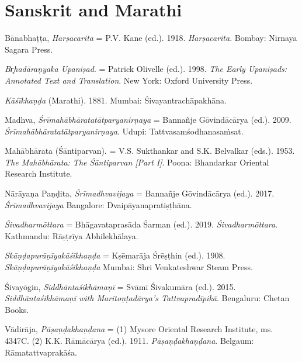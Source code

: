 \section*{Sanskrit and Marathi}
\begin{hangparas}{0.125in}{1}

          
          \label{Kane1918}Bānabhaṭṭa, \emph{{Harṣacarita}} = P.V. Kane (ed.). 1918. \emph{{Harṣacarita}}. Bombay: Nirnaya Sagara Press.\medskip


	  \label{Olivelle1998}\emph{{Br̥hadāraṇyaka Upaniṣad}}. = Patrick Olivelle (ed.). 1998. \emph{The Early Upaniṣads: Annotated Text and Translation}. New York: Oxford University Press.\medskip


          \emph{{Kāśīkhaṇḍa}} (Marathi). 1881. Mumbai: Śivayantrachāpakhāna.\medskip


          \label{Madhva2009}Madhva, \emph{{Śrīmahābhāratatātparyanirṇaya}} = Bannañje Gōvindācārya (ed.). 2009. \emph{{Śrīmahābhāratatātparyanirṇaya}}. Udupi: Tattvasamśodhanasaṁsat.\medskip


	  \label{MBh}Mahābhārata (Śāntiparvan). = V.\thinskip{}S. Sukthankar and S.\thinskip{}K. Belvalkar (eds.). 1953. \emph{The Mahābhārata: The Śāntiparvan [Part I]}. Poona: Bhandarkar Oriental Research Institute.\medskip


          \label{NarayanaPandita2017}Nārāyaṇa Paṇḍita, \emph{{Śrīmadhvavijaya}} = Bannañje Gōvindācārya (ed.). 2017. \emph{{Śrīmadhvavijaya}} Bangalore: Dvaipāyanapratiṣṭhāna.\medskip


          \label{Sivadharmottara}\emph{{Śivadharmōttara}} =  Bhāgavataprasāda Śarman (ed.). 2019. \emph{{Śivadharmōttara}}. Kathmandu:  Rāṣṭrīya Abhilekhālaya. \medskip


          \label{Kasikhanda1908}\emph{{Skāṇḍapurāṇīyakāśīkhaṇḍa}} = Kṣēmarāja Śrēṣṭhin (ed.). 1908. \emph{{Skāṇḍapurāṇīyakāśīkhaṇḍa}} Mumbai: Shri Venkateshwar Steam Press.\medskip


          \label{Sivayogin2015}Śivayōgin, \emph{{Siddhāntaśikhāmaṇī}} = Svāmī Śivakumāra (ed.). 2015. \emph{Siddhāntaśikhāmaṇī with Maritoṇṭadārya’s Tattvapradīpikā}. Bengaluru: Chetan Books.\medskip


          Vādirāja, \emph{{Pāṣaṇḍakhaṇḍana}} = (1) Mysore Oriental Research Institute, ms. 4347C. (2) K.\thinskip{}K. Rāmācārya (ed.). 1911. \emph{{Pāṣaṇḍakhaṇḍana}}. Belgaum: Rāmatattvaprakāśa.\medskip



\end{hangparas}
